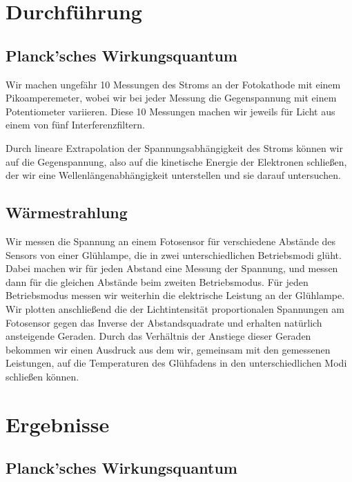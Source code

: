 \documentclass[12pt,a4paper,twopage]{article}
\begin{document}
\section{Durchführung}
\subsection{Planck'sches Wirkungsquantum}
Wir machen ungefähr 10 Messungen des Stroms an der Fotokathode mit einem Pikoamperemeter, wobei wir bei jeder Messung die Gegenspannung mit einem Potentiometer variieren. Diese 10 Messungen machen wir jeweils für Licht aus einem von fünf Interferenzfiltern.  

Durch lineare Extrapolation der Spannungsabhängigkeit des Stroms können wir auf die Gegenspannung, also auf die kinetische Energie der Elektronen schließen, der wir eine Wellenlängenabhängigkeit unterstellen und sie darauf untersuchen.
\subsection{Wärmestrahlung}
Wir messen die Spannung an einem Fotosensor für verschiedene Abstände des Sensors von einer Glühlampe, die in zwei unterschiedlichen Betriebsmodi glüht. Dabei machen wir für jeden Abstand eine Messung der Spannung, und messen dann für die gleichen Abstände beim zweiten Betriebsmodus. Für jeden Betriebsmodus messen wir weiterhin die elektrische Leistung an der Glühlampe. Wir plotten anschließend die der Lichtintensität proportionalen Spannungen am Fotosensor gegen das Inverse der Abstandsquadrate und erhalten natürlich ansteigende Geraden. Durch das Verhältnis der Anstiege dieser Geraden bekommen wir einen Ausdruck aus dem wir, gemeinsam mit den gemessenen Leistungen, auf die Temperaturen des Glühfadens in den unterschiedlichen Modi schließen können.

\section{Ergebnisse}
\subsection{Planck'sches Wirkungsquantum}
\end{document}
